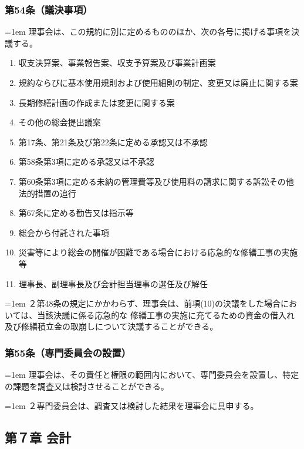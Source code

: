 \documentclass[
  twoside,
  luatex,
  paper=a4paper,
  fontsize=11pt,
  jafontsize=11pt,
  jlreq_notes,
]{jlreq}
\newcommand{\joumain}[1]{%
  \noindent\hangindent=1em\hangafter=1
  \hspace{1em}#1%
}
\newcommand{\kou}[2]{%
  \par\noindent\hangindent=1em\hangafter=1
  #1\hspace{1em}#2%
}
\begin{document}
  \subsubsection*{第54条（議決事項）}
  \joumain{理事会は、この規約に別に定めるもののほか、次の各号に掲げる事項を決議する。}
  \begin{enumerate}
    \item 収支決算案、事業報告案、収支予算案及び事業計画案
    \item 規約ならびに基本使用規則および使用細則の制定、変更又は廃止に関する案
    \item 長期修繕計画の作成または変更に関する案
    \item その他の総会提出議案
    \item 第17条、第21条及び第22条に定める承認又は不承認
    \item 第58条第3項に定める承認又は不承認
    \item 第60条第3項に定める未納の管理費等及び使用料の請求に関する訴訟その他法的措置の追行
    \item 第67条に定める勧告又は指示等
    \item 総会から付託された事項
    \item 災害等により総会の開催が困難である場合における応急的な修繕工事の実施等
    \item 理事長、副理事長及び会計担当理事の選任及び解任
  \end{enumerate}
  \kou{２}{第48条の規定にかかわらず、理事会は、前項(10)の決議をした場合においては、当該決議に係る応急的な
  修繕工事の実施に充てるための資金の借入れ及び修繕積立金の取崩しについて決議することができる。}

  \subsubsection*{第55条（専門委員会の設置）}
  \joumain{理事会は、その責任と権限の範囲内において、専門委員会を設置し、特定の課題を調査又は検討させることができる。}
  \kou{２}{専門委員会は、調査又は検討した結果を理事会に具申する。}
  
  \begin{center}
  \subsection*{第７章 会計}
  \end{center}
\end{document}
